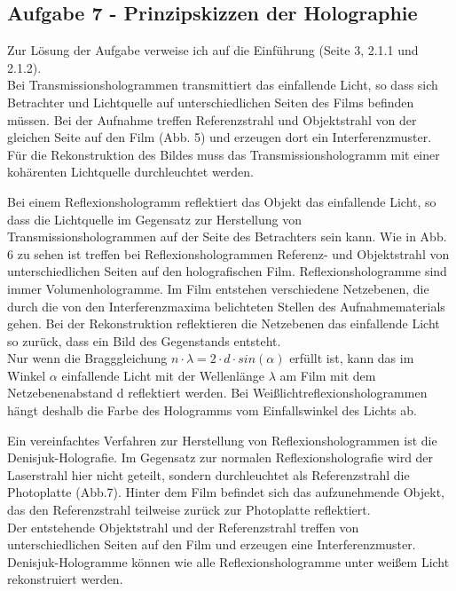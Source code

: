 \subsection*{Aufgabe 7 - Prinzipskizzen der Holographie}
Zur Lösung der Aufgabe verweise ich auf die Einführung (Seite 3, 2.1.1 und 2.1.2). \\
Bei Transmissionshologrammen transmittiert das einfallende Licht, so dass sich Betrachter und Lichtquelle auf unterschiedlichen Seiten des Films befinden müssen. Bei der Aufnahme treffen Referenzstrahl und Objektstrahl von der gleichen Seite auf den Film (Abb. 5) und erzeugen dort ein Interferenzmuster. Für die Rekonstruktion des Bildes muss das Transmissionshologramm mit einer kohärenten Lichtquelle durchleuchtet werden.


Bei einem Reflexionshologramm reflektiert das Objekt das einfallende Licht, so dass die Lichtquelle im Gegensatz zur Herstellung von Transmissionshologrammen auf der Seite des Betrachters sein kann. Wie in Abb. 6 zu sehen ist treffen bei Reflexionshologrammen Referenz- und Objektstrahl von unterschiedlichen Seiten auf den holografischen Film. Reflexionshologramme sind immer Volumenhologramme. Im Film entstehen verschiedene Netzebenen, die durch die von den Interferenzmaxima belichteten Stellen des Aufnahmematerials gehen. Bei der Rekonstruktion reflektieren die Netzebenen das einfallende Licht so zurück, dass ein Bild des Gegenstands entsteht.\\
Nur wenn die Bragggleichung $n \cdot \lambda = 2 \cdot d \cdot sin \left( \alpha \right)$ erfüllt ist, kann das im Winkel $\alpha$ einfallende Licht mit der Wellenlänge $\lambda$ am Film mit dem Netzebenenabstand d reflektiert werden. Bei Weißlichtreflexionshologrammen hängt deshalb die Farbe des Hologramms vom Einfallswinkel des Lichts ab.


Ein vereinfachtes Verfahren zur Herstellung von Reflexionshologrammen ist die Denisjuk-Holografie. Im Gegensatz zur normalen Reflexionsholografie wird der Laserstrahl hier nicht geteilt, sondern durchleuchtet als Referenzstrahl die Photoplatte (Abb.7).
Hinter dem Film befindet sich das aufzunehmende Objekt, das den Referenzstrahl teilweise zurück zur Photoplatte reflektiert.\\
Der entstehende Objektstrahl und der Referenzstrahl treffen von unterschiedlichen Seiten auf den Film und erzeugen eine Interferenzmuster. Denisjuk-Hologramme können wie alle Reflexionshologramme unter weißem Licht rekonstruiert werden.

